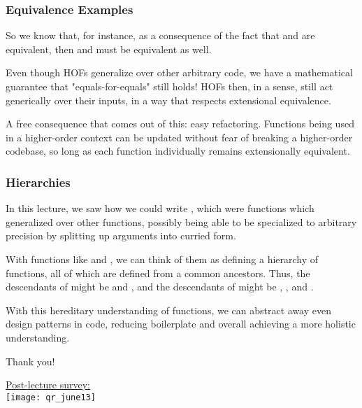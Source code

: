 \documentclass[aspectratio=169, handout]{beamer}
\begin{document}
\begin{frame}[fragile]
  \frametitle{Equivalence Examples}

  So we know that, for instance, as a consequence of the fact that 
  and  are equivalent, then  and 
   must be equivalent as well.

  \pause
  \vspace{\fill}

  Even though HOFs generalize over other arbitrary code, we have a mathematical guarantee
  that "equals-for-equals" still holds! HOFs then, in a sense, still act generically over
  their inputs, in a way that respects extensional equivalence.

  \pause
  \vspace{\fill}

  A free consequence that comes out of this: easy refactoring. Functions being
  used in a higher-order context can be updated without fear of breaking a 
  higher-order codebase, so long as each function individually remains 
  extensionally equivalent.\footnotemark

\end{frame}

\begin{frame}[fragile]
  \frametitle{Hierarchies}

  In this lecture, we saw how we could write , which were
  functions which generalized over other functions, possibly being able to be specialized
  to arbitrary precision by splitting up arguments into curried form.

  \pause
  \vspace{\fill}

  With functions like  and , we can think of them as defining
  a hierarchy of functions, all of which are defined from a common ancestors. Thus, the
  descendants of  might be  and , 
  and the descendants of  might be , , and .

  \pause
  \vspace{\fill}

  With this hereditary understanding of functions, we can abstract away even design patterns
  in code, reducing boilerplate and overall achieving a more holistic understanding.
\end{frame}

\begin{frame}[plain]
	\begin{center} Thank you! \end{center}

	\begin{center} 
    {\color{blue} \href{https://docs.google.com/forms/d/e/1FAIpQLSePEQPNEkoVPHE5N8IglA9sEx1RHpOBc-vb0uVgULtRSJw4rQ/viewform?usp=sf_link}{Post-lecture survey:}} \\
    \vspace{5pt}
    \texttt{[image: qr\_june13]}
  \end{center}
\end{frame}
\end{document}
